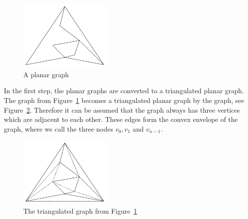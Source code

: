 \documentclass[a4paper]{scrartcl}
\begin{document}
\begin{figure}[h]
	\centering
	\includegraphics[width=0.4\textwidth]{img/planar}
	\caption{A planar graph}
	\label{fig:planar}
\end{figure}


In the first step, the planar graphs are converted to a triangulated planar graph.
The graph from Figure~\ref{fig:planar} becomes a triangulated planar graph by the graph, see Figure~\ref{fig:triangulated}.
Therefore it can be assumed that the graph always has three vertices which are adjacent to each other. These edges form the convex envelope of the graph, where we call the three nodes $v_0,v_1$ and $v_{n-1}$.



\begin{figure}[h]
	\centering
	\includegraphics[width=0.4\textwidth]{img/triangulated}
	\caption{The triangulated  graph from Figure~\ref{fig:planar}}
	\label{fig:triangulated}
\end{figure}
\end{document}
